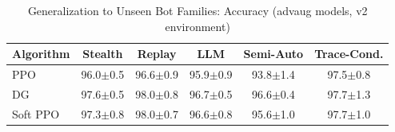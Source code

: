 \begin{table}[h]
\centering
\caption{Generalization to Unseen Bot Families: Accuracy (advaug models, v2 environment)}
\label{tab:heldout_families}
\begin{tabular}{lccccc}
\toprule
Algorithm & Stealth & Replay & LLM & Semi-Auto & Trace-Cond. \\
\midrule
  PPO & 96.0$\pm$0.5 & 96.6$\pm$0.9 & 95.9$\pm$0.9 & 93.8$\pm$1.4 & 97.5$\pm$0.8 \\
  DG & 97.6$\pm$0.5 & 98.0$\pm$0.8 & 96.7$\pm$0.5 & 96.6$\pm$0.4 & 97.7$\pm$1.3 \\
  Soft PPO & 97.3$\pm$0.8 & 98.0$\pm$0.7 & 96.6$\pm$0.8 & 95.6$\pm$1.0 & 97.7$\pm$1.0 \\
\bottomrule
\end{tabular}
\end{table}